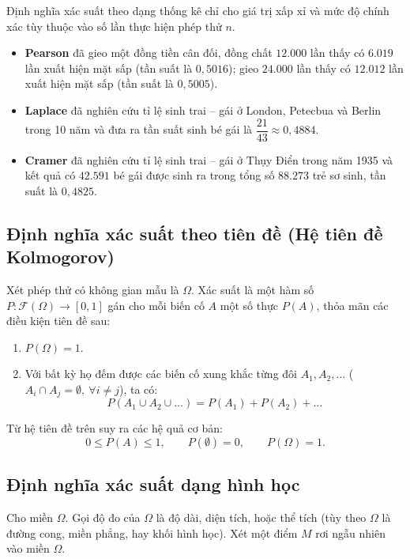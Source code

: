 \begin{nhanxet}
Định nghĩa xác suất theo dạng thống kê chỉ cho giá trị xấp xỉ và mức độ chính xác tùy thuộc vào số lần thực hiện phép thử $n$.
\end{nhanxet}

\begin{vidu}
\begin{itemize}
    \item \textbf{Pearson} đã gieo một đồng tiền cân đối, đồng chất $12.000$ lần thấy có $6.019$ lần xuất hiện mặt sấp (tần suất là $0{,}5016$); gieo $24.000$ lần thấy có $12.012$ lần xuất hiện mặt sấp (tần suất là $0{,}5005$).
    \item \textbf{Laplace} đã nghiên cứu tỉ lệ sinh trai -- gái ở London, Petecbua và Berlin trong 10 năm và đưa ra tần suất sinh bé gái là $\dfrac{21}{43} \approx 0{,}4884$.
    \item \textbf{Cramer} đã nghiên cứu tỉ lệ sinh trai -- gái ở Thụy Điển trong năm 1935 và kết quả có $42.591$ bé gái được sinh ra trong tổng số $88.273$ trẻ sơ sinh, tần suất là $0{,}4825$.
\end{itemize}
\end{vidu}

\subsection{Định nghĩa xác suất theo tiên đề (Hệ tiên đề Kolmogorov)}
\begin{dinhnghia}
Xét phép thử có không gian mẫu là $\Omega$. Xác suất là một hàm số $P: \mathcal{F}(\Omega) \to [0, 1]$ gán cho mỗi biến cố $A$ một số thực $P(A)$, thỏa mãn các điều kiện tiên đề sau:
\begin{enumerate}[label=\arabic*)]
    \item $P(\Omega) = 1$.
    \item Với bất kỳ họ đếm được các biến cố xung khắc từng đôi $A_1, A_2, \dots$ ($A_i \cap A_j = \emptyset,\ \forall i \ne j$), ta có:
    \[
    P(A_1 \cup A_2 \cup \dots) = P(A_1) + P(A_2) + \dots
    \]
\end{enumerate}
Từ hệ tiên đề trên suy ra các hệ quả cơ bản:
\[
0 \le P(A) \le 1,\qquad P(\emptyset) = 0,\qquad P(\Omega) = 1.
\]
\end{dinhnghia}

\subsection{Định nghĩa xác suất dạng hình học}
Cho miền $\Omega$. Gọi độ đo của $\Omega$ là độ dài, diện tích, hoặc thể tích (tùy theo $\Omega$ là đường cong, miền phẳng, hay khối hình học). Xét một điểm $M$ rơi ngẫu nhiên vào miền $\Omega$.

